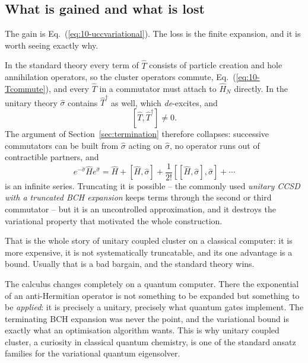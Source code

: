\subsection{What is gained and what is lost}
\label{sec:ucctradeoff}

The gain is Eq.~(\ref{eq:10-uccvariational}).  The loss is the finite
expansion, and it is worth seeing exactly why.

In the standard theory every term of $\hat{T}$ consists of particle creation
and hole annihilation operators, so the cluster operators commute,
Eq.~(\ref{eq:10-Tcommute}), and every $\hat{T}$ in a commutator must attach to
$\hat{H}_N$ directly.  In the unitary theory $\hat{\sigma}$ contains
$\hat{T}^{\dagger}$ as well, which \emph{de}-excites, and
\begin{equation}
  \left[\hat{T},\hat{T}^{\dagger}\right] \ne 0 .
  \label{eq:10-Tnotcommute}
\end{equation}
The argument of Section~\ref{sec:termination} therefore collapses: successive
commutators can be built from $\hat{\sigma}$ acting on $\hat{\sigma}$, no
operator runs out of contractible partners, and
\begin{equation}
  e^{-\hat{\sigma}}\hat{H}e^{\hat{\sigma}}
   = \hat{H} + \left[\hat{H},\hat{\sigma}\right]
   + \frac{1}{2!}\left[\left[\hat{H},\hat{\sigma}\right],\hat{\sigma}\right]
   + \cdots
  \label{eq:10-uccbch}
\end{equation}
is an infinite series.  Truncating it is possible -- the commonly used
\emph{unitary CCSD with a truncated BCH expansion} keeps terms through the
second or third commutator -- but it is an uncontrolled approximation, and it
destroys the variational property that motivated the whole construction.

That is the whole story of unitary coupled cluster on a classical computer: it
is more expensive, it is not systematically truncatable, and its one advantage
is a bound.  Usually that is a bad bargain, and the standard theory wins.

The calculus changes completely on a quantum computer.  There the exponential
of an anti-Hermitian operator is not something to be expanded but something to
be \emph{applied}: it is precisely a unitary, precisely what quantum gates
implement.  The terminating BCH expansion was never the point, and the
variational bound is exactly what an optimisation algorithm wants.  This is
why unitary coupled cluster, a curiosity in classical quantum chemistry, is
one of the standard ansatz families for the variational quantum eigensolver.

